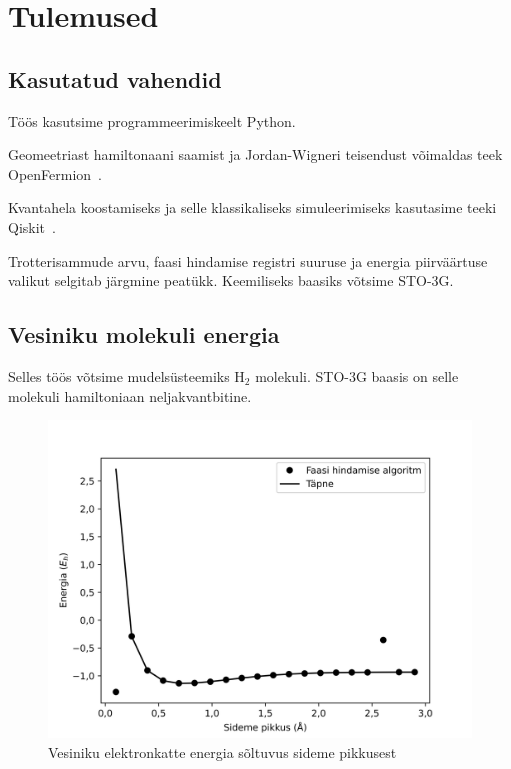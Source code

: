 \documentclass[12pt]{report}
\begin{document}
\chapter{Tulemused}\label{chap:results}

\section{Kasutatud vahendid}

Töös kasutsime programmeerimiskeelt Python.

Geomeetriast hamiltonaani saamist ja Jordan-Wigneri teisendust võimaldas teek OpenFermion~\cite{openfermion}.

Kvantahela koostamiseks ja selle klassikaliseks simuleerimiseks kasutasime teeki Qiskit~\cite{qiskit}.

Trotterisammude arvu, faasi hindamise registri suuruse ja energia piirväärtuse valikut selgitab järgmine peatükk.
Keemiliseks baasiks võtsime STO-3G.

\section{Vesiniku molekuli energia}

Selles töös võtsime mudelsüsteemiks \(\mathrm{H}_2\) molekuli.
STO-3G baasis on selle molekuli hamiltoniaan neljakvantbitine.

\begin{figure}[h]
    \centering
    \includegraphics{scan.jpg}
    \caption{Vesiniku elektronkatte energia sõltuvus sideme pikkusest}
    \label{fig:scan}
\end{figure}
\end{document}
